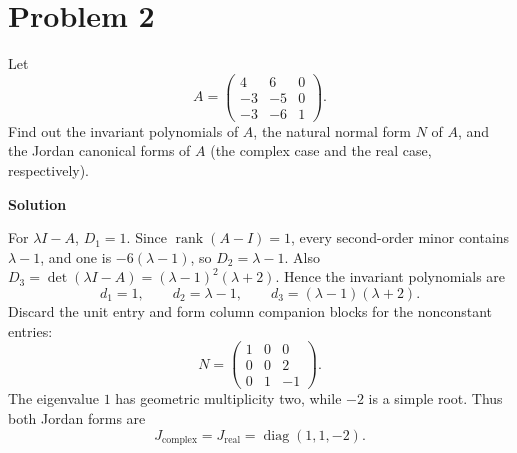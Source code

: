 \documentclass[UTF8,10pt,letterpaper,fontset=fandol]{ctexart}
\newcommand{\Solution}{\par\Needspace{4\baselineskip}\textbf{Solution}\par}
\begin{document}
\section{Problem 2}
Let
\[
A=\begin{pmatrix}4&6&0\\-3&-5&0\\-3&-6&1\end{pmatrix}.
\]
Find out the invariant polynomials of $A$, the natural normal form $N$ of $A$, and the Jordan canonical forms of $A$ (the complex case and the real case, respectively).
\Solution
For $\lambda I-A$, $D_1=1$. Since $\operatorname{rank}(A-I)=1$, every second-order minor contains $\lambda-1$, and one is $-6(\lambda-1)$, so $D_2=\lambda-1$.
Also $D_3=\det(\lambda I-A)=(\lambda-1)^2(\lambda+2)$. Hence the invariant polynomials are
\[
\boxed{d_1=1,\qquad d_2=\lambda-1,\qquad d_3=(\lambda-1)(\lambda+2)}.
\]
Discard the unit entry and form column companion blocks for the nonconstant entries:
\[
\boxed{N=\begin{pmatrix}1&0&0\\0&0&2\\0&1&-1\end{pmatrix}}.
\]
The eigenvalue $1$ has geometric multiplicity two, while $-2$ is a simple root. Thus both Jordan forms are
\[
\boxed{J_{\mathrm{complex}}=J_{\mathrm{real}}=\operatorname{diag}(1,1,-2)}.
\]

\newpage
\end{document}
